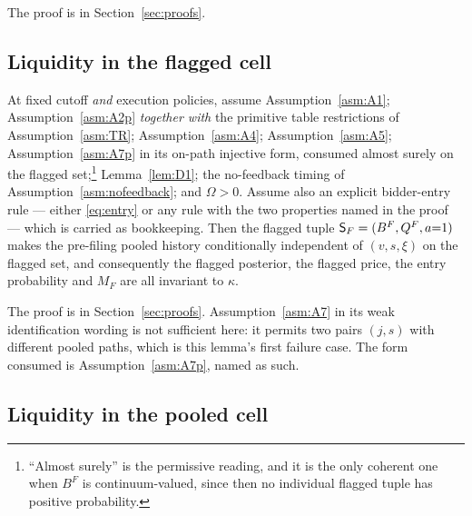 The proof is in Section~\ref{sec:proofs}.

\subsection{Liquidity in the flagged cell}
\label{sec:flagged-results}

\begin{lemma}
\label{lem:L2}
At fixed cutoff \emph{and} execution policies, assume Assumption~\ref{asm:A1};
Assumption~\ref{asm:A2p} \emph{together with} the primitive table restrictions of
Assumption~\ref{asm:TR}; Assumption~\ref{asm:A4}; Assumption~\ref{asm:A5};
Assumption~\ref{asm:A7p} in its on-path injective form, consumed almost surely on the flagged
set;\footnote{``Almost surely'' is the permissive reading, and it is the only coherent one when
$B^F$ is continuum-valued, since then no individual flagged tuple has positive probability.}
Lemma~\ref{lem:D1}; the no-feedback timing of Assumption~\ref{asm:nofeedback}; and $\Omega > 0$.
Assume also an explicit bidder-entry rule --- either \eqref{eq:entry} or any rule with the two
properties named in the proof --- which is carried as bookkeeping. Then the flagged tuple
$\mathsf{S}_F = (B^F, Q^F, a{=}1)$ makes the pre-filing pooled history conditionally independent of
$(v,s,\xi)$ on the flagged set, and consequently the flagged posterior, the flagged price, the entry
probability and $M_F$ are all invariant to $\kappa$.
\end{lemma}

The proof is in Section~\ref{sec:proofs}. Assumption~\ref{asm:A7} in its weak identification wording
is not sufficient here: it permits two pairs $(j,s)$ with different pooled paths, which is this
lemma's first failure case. The form consumed is Assumption~\ref{asm:A7p}, named as such.

\subsection{Liquidity in the pooled cell}
\label{sec:pooled-results}


